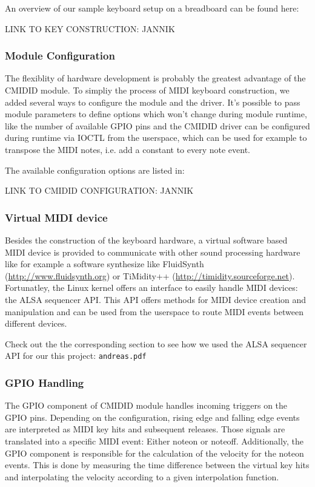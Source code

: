 \documentclass[paper=a4,fontsize=11pt,twocolumn,pagesize,bibtotoc]{scrartcl}
\begin{document}
An overview of our sample keyboard setup on a breadboard can be found here:

LINK TO KEY CONSTRUCTION: JANNIK

\subsubsection{Module Configuration}
\label{cmidid:configuration}

The flexiblity of hardware development is probably the greatest advantage of 
the CMIDID module. To simpliy the process of MIDI keyboard construction, we 
added several ways to configure the module and the driver. It's possible to 
pass module parameters to define options which won't change during module 
runtime, like the number of available GPIO pins and the CMIDID driver can 
be configured during runtime via IOCTL from the userspace, which can be used 
for example to transpose the MIDI notes, i.e. add a constant to every note 
event.

The available configuration options are listed in:

LINK TO CMIDID CONFIGURATION: JANNIK

\subsubsection{Virtual MIDI device}
\label{cmidid:midi}

Besides the construction of the keyboard hardware, a virtual software based 
MIDI device is provided to communicate with other sound processing hardware 
like for example a software synthesize like FluidSynth 
(\url{http://www.fluidsynth.org}) or TiMidity++ 
(\url{http://timidity.sourceforge.net}). Fortunatley, the Linux kernel 
offers an interface to easily handle MIDI devices: the ALSA sequencer API.
This API offers methods for MIDI 
device creation and manipulation and can be used from the userspace to 
route MIDI events between different devices.

Check out the the corresponding section to see how we used the ALSA sequencer API for
our this project: \texttt{andreas.pdf}

\subsubsection{GPIO Handling}
\label{cmidid:gpio}

The GPIO component of CMIDID module handles incoming triggers on the GPIO 
pins. Depending on the configuration, rising edge and falling edge events 
are interpreted as MIDI key hits and subsequent releases. Those signals are 
translated into a specific MIDI event: Either noteon or noteoff. Additionally, 
the GPIO component is responsible for the calculation of the velocity for 
the noteon events. This is done by measuring the time difference between 
the virtual key hits and interpolating the velocity according to a given 
interpolation function.
\end{document}
